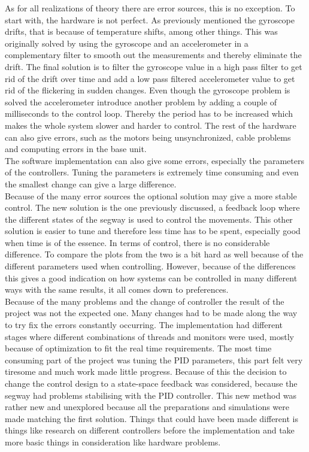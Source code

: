 \documentclass[a4paper]{article}
\begin{document}
As for all realizations of theory there are error sources, this is no exception. To start with, the hardware is not perfect. As previously mentioned the gyroscope drifts, that is because of temperature shifts, among other things. This was originally solved by using the gyroscope and an accelerometer in a complementary filter to smooth out the measurements and thereby eliminate the drift. The final solution is to filter the gyroscope value in a high pass filter to get rid of the drift over time and add a low pass filtered accelerometer value to get rid of the flickering in sudden changes. Even though the gyroscope problem is solved the accelerometer introduce another problem by adding a couple of milliseconds to the control loop. Thereby the period has to be increased which makes the whole system slower and harder to control. The rest of the hardware can also give errors, such as the motors being unsynchronized, cable problems and computing errors in the base unit\cite{filter}.\\

The software implementation can also give some errors, especially the parameters of the controllers. Tuning the parameters is extremely time consuming and even the smallest change can give a large difference.\\

Because of the many error sources the optional solution may give a more stable control. The new solution is the one previously discussed, a feedback loop where the different states of the segway is used to control the movements. This other solution is easier to tune and therefore less time has to be spent, especially good when time is of the essence. In terms of control, there is no considerable difference. To compare the plots from the two is a bit hard as well because of the different parameters used when controlling. However, because of the differences this gives a good indication on how systems can be controlled in many different ways with the same results, it all comes down to preferences. \\

Because of the many problems and the change of controller the result of the project was not the expected one. Many changes had to be made along the way to try fix the errors constantly occurring. The implementation had different stages where different combinations of threads and monitors were used, mostly because of optimization to fit the real time requirements. The most time consuming part of the project was tuning the PID parameters, this part felt very tiresome and much work made little progress. Because of this the decision to change the control design to a state-space feedback was considered, because the segway had problems stabilising with the PID controller. This new method was rather new and unexplored because all the preparations and simulations were made matching the first solution. Things that could have been made different is things like research on different controllers before the implementation and take more basic things in consideration like hardware problems.
\end{document}
